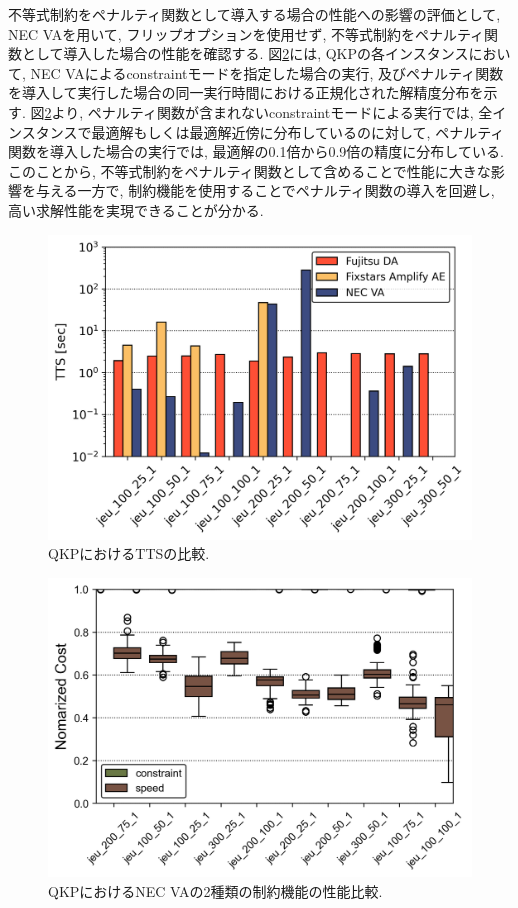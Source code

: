 \documentclass[submit,techrep,noauthor]{ipsj}
\begin{document}
不等式制約をペナルティ関数として導入する場合の性能への影響の評価として, NEC VAを用いて, フリップオプションを使用せず, 不等式制約をペナルティ関数として導入した場合の性能を確認する. 図\ref{QKP_speed_vs_const}には, QKPの各インスタンスにおいて, NEC VAによるconstraintモードを指定した場合の実行, 及びペナルティ関数を導入して実行した場合の同一実行時間における正規化された解精度分布を示す. 図\ref{QKP_speed_vs_const}より, ペナルティ関数が含まれないconstraintモードによる実行では, 全インスタンスで最適解もしくは最適解近傍に分布しているのに対して, ペナルティ関数を導入した場合の実行では, 最適解の0.1倍から0.9倍の精度に分布している. このことから, 不等式制約をペナルティ関数として含めることで性能に大きな影響を与える一方で, 制約機能を使用することでペナルティ関数の導入を回避し, 高い求解性能を実現できることが分かる.

\begin{figure}[hb]
\centering
\includegraphics[bb=0 0 700 280, width=15cm]{TTS_QKP.png}
\caption{QKPにおけるTTSの比較.}
\label{QKP_TTS}
\end{figure}

\begin{figure}[hb]
\centering
\includegraphics[bb=0 0 700 280, width=15cm]{speed_vs_constraint_QKP.png}
\caption{QKPにおけるNEC VAの2種類の制約機能の性能比較.}
\label{QKP_speed_vs_const}
\end{figure}
\end{document}
